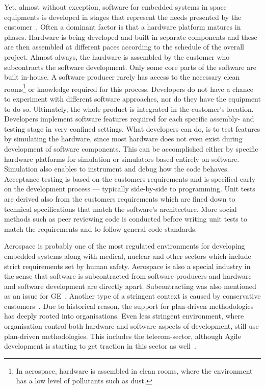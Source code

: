 \documentclass[english]{tktltiki2}
\begin{document}
Yet, almost without exception, software for embedded systems in space equipments is developed in stages that represent the needs presented by the customer~\cite{Hol15b}. Often a dominant factor is that a hardware platform matures in phases. Hardware is being developed and built in separate components and these are then assembled at different paces according to the schedule of the overall project. Almost always, the hardware is assembled by the customer who subcontracts the software development. Only some core parts of the software are built in-house. A software producer rarely has access to the necessary clean rooms\footnote{In aerospace, hardware is assembled in clean rooms, where the environment has a low level of pollutants such as dust.} or knowledge required for this process. Developers do not have a chance to experiment with different software approaches, nor do they have the equipment to do so. Ultimately, the whole product is integrated in the customer’s location. Developers implement software features required for each specific assembly- and testing stage in very confined settings. What developers can do, is to test features by simulating the hardware, since most hardware does not even exist during development of software components. This can be accomplished either by specific hardware platforms for simulation or simulators based entirely on software. Simulation also enables to instrument and debug how the code behaves. Acceptance testing is based on the customers requirements and is specified early on the development process — typically side-by-side to programming. Unit tests are derived also from the customers requirements which are fined down to technical specifications that match the software’s architecture. More social methods such as peer reviewing code is conducted before writing unit tests to match the requirements and to follow general code standards.

Aerospace is probably one of the most regulated environments for developing embedded systems along with medical, nuclear and other sectors which include strict requirements set by human safety. Aerospace is also a special industry in the sense that software is subcontracted from software producers and hardware and software development are directly apart. Subcontracting was also mentioned as an issue for GE~\cite{BT15}. Another type of a stringent context is caused by conservative customers~\cite{Koi15}. Due to historical reason, the support for plan-driven methodologies has deeply rooted into organisations. Even less stringent environment, where organisation control both hardware and software aspects of development, still use plan-driven methodologies. This includes the telecom-sector, although Agile development is starting to get traction in this sector as well~\cite{LTR14}.
\end{document}
